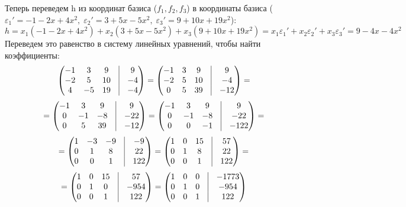 \documentclass[a4paper,12pt]{article}
\begin{document}
Теперь переведем h из координат базиса ($f_1, f_2, f_3$) в координаты базиса ($\varepsilon_1' = -1 - 2x + 4x^2, \; \varepsilon_2' = 3 + 5x -5x^2, \; \varepsilon_3' = 9 + 10x + 19x^2$):
\[
h = x_1(-1 - 2x + 4x^2) + x_2(3 + 5x -5x^2) + x_3(9 + 10x + 19x^2) = x_1 \varepsilon_1' + x_2 \varepsilon_2' + x_3 \varepsilon_3' = 9 -4x -4x^2 
\]
Переведем это равенство в систему линейных уравнений, чтобы найти коэффициенты:
\[
\begin{pmatrix}
-1 & 3 & 9 & \vrule &9  \\
-2 & 5 & 10 & \vrule &-4 \\
4 & -5 & 19 & \vrule &-4 \\
\end{pmatrix}
=
\begin{pmatrix}
-1 & 3 & 9 & \vrule &9 \\
-2 & 5 & 10 & \vrule &-4 \\
0 & 5 & 39 & \vrule &-12  \\
\end{pmatrix}
=
\]
\[
=
\begin{pmatrix}
-1 & 3 & 9 & \vrule &9 \\
0 & -1 & -8 & \vrule &-22  \\
0 & 5 & 39 & \vrule &-12  \\
\end{pmatrix}
=
\begin{pmatrix}
-1 & 3 & 9 & \vrule &9 \\
0 & -1 & -8 & \vrule &-22  \\
0 & 0 & -1 & \vrule &-122\\
\end{pmatrix}
=
\]
\[
=
\begin{pmatrix}
1 & -3 & -9 & \vrule &-9  \\
0 & 1 & 8 & \vrule &22 \\
0 & 0 & 1 & \vrule &122 \\
\end{pmatrix}
=
\begin{pmatrix}
1 & 0 & 15 & \vrule &57  \\
0 & 1 & 8 & \vrule &22 \\
0 & 0 & 1 & \vrule &122  \\
\end{pmatrix}
=
\]
\[
=
\begin{pmatrix}
1 & 0 & 15 & \vrule &57 \\
0 & 1 & 0 & \vrule &-954 \\
0 & 0 & 1 & \vrule &122\\
\end{pmatrix}
=
\begin{pmatrix}
1 & 0 & 0 & \vrule &-1773 \\
0 & 1 & 0 & \vrule &-954 \\
0 & 0 & 1 & \vrule &122 \\
\end{pmatrix}
\]
\end{document}
